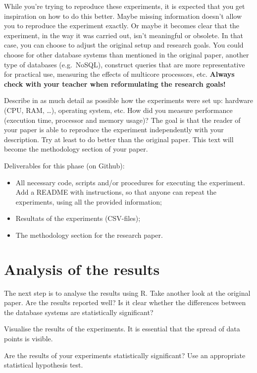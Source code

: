 \documentclass[fleqn,10pt]{artikeltin}
\begin{document}
While you're trying to reproduce these experiments, it is expected that you get inspiration on how to do this better. Maybe missing information doesn't allow you to reproduce the experiment exactly. Or maybe it becomes clear that the experiment, in the way it was carried out, isn't meaningful or obsolete. In that case, you can choose to adjust the original setup and research goals. You could choose for other database systems than mentioned in the original paper, another type of databases (e.g.~NoSQL), construct queries that are more representative for practical use, measuring the effects of multicore processors, etc. \textbf{Always check with your teacher when reformulating the research goals!}

Describe in as much detail as possible how the experiments were set up: hardware (CPU, RAM, \ldots), operating system, etc. How did you measure performance (execution time, processor and memory usage)? The goal is that the reader of your paper is able to reproduce the experiment independently with your description. Try at least to do better than the original paper. This text will become the methodology section of your paper.

Deliverables for this phase (on Github):

\begin{itemize}
	\item All necessary code, scripts and/or procedures for executing the experiment. Add a README with instructions, so that anyone can repeat the experiments, using all the provided information;
	\item Resultats of the experiments (CSV-files);
	\item The methodology section for the research paper.
\end{itemize}


\section{Analysis of the results}
\label{sec:analysis}

The next step is to analyse the results using R. Take another look at the original paper. Are the results reported well? Is it clear whether the differences between the database systems are statistically significant?

Visualise the results of the experiments. It is essential that the spread of data points is visible.

Are the results of your experiments statistically significant? Use an appropriate statistical hypothesis test.
\end{document}

